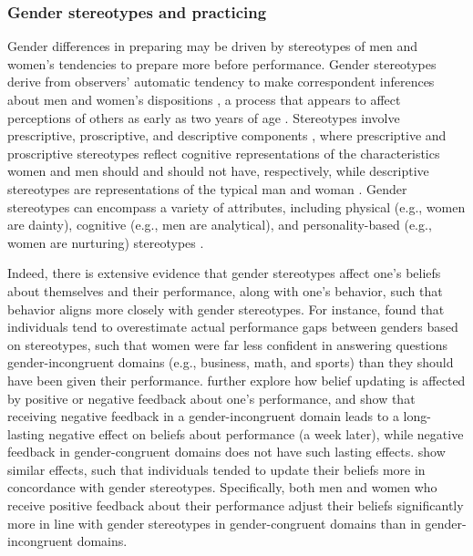\documentclass[a4paper, nobind]{templates/ociamthesis}
\begin{document}
\hypertarget{gender-stereotypes-and-practicing}{%
\subsubsection{Gender stereotypes and practicing}\label{gender-stereotypes-and-practicing}}

Gender differences in preparing may be driven by stereotypes of men and women's tendencies to prepare more before performance. Gender stereotypes derive from observers' automatic tendency to make correspondent inferences about men and women's dispositions \autocite{Gilbert1995,Ross1977,Jones1967,Gawronski2004}, a process that appears to affect perceptions of others as early as two years of age \autocite{Poulin-Dubois2002,Serbin2002}. Stereotypes involve prescriptive, proscriptive, and descriptive components \autocite{Prentice2002}, where prescriptive and proscriptive stereotypes reflect cognitive representations of the characteristics women and men should and should not have, respectively, while descriptive stereotypes are representations of the typical man and woman \autocite{Burgess1999}. Gender stereotypes can encompass a variety of attributes, including physical (e.g., women are dainty), cognitive (e.g., men are analytical), and personality-based (e.g., women are nurturing) stereotypes \autocite{Cejka1999,Deaux1984}.

Indeed, there is extensive evidence that gender stereotypes affect one's beliefs about themselves and their performance, along with one's behavior, such that behavior aligns more closely with gender stereotypes. For instance, \textcite{Bordalo2019} found that individuals tend to overestimate actual performance gaps between genders based on stereotypes, such that women were far less confident in answering questions gender-incongruent domains (e.g., business, math, and sports) than they should have been given their performance. \textcite{Coffman2021} further explore how belief updating is affected by positive or negative feedback about one's performance, and show that receiving negative feedback in a gender-incongruent domain leads to a long-lasting negative effect on beliefs about performance (a week later), while negative feedback in gender-congruent domains does not have such lasting effects. \textcite{Coffman2019} show similar effects, such that individuals tended to update their beliefs more in concordance with gender stereotypes. Specifically, both men and women who receive positive feedback about their performance adjust their beliefs significantly more in line with gender stereotypes in gender-congruent domains than in gender-incongruent domains.
\end{document}
